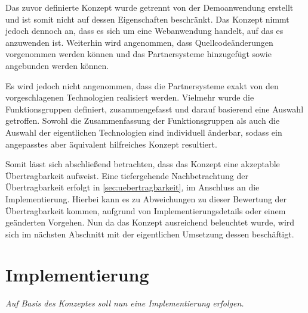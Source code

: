	Das zuvor definierte Konzept wurde getrennt von der Demoanwendung erstellt und ist somit nicht auf dessen Eigenschaften beschränkt. Das Konzept nimmt jedoch dennoch an, dass es sich um eine Webanwendung handelt, auf das es anzuwenden ist. Weiterhin wird angenommen, dass Quellcodeänderungen vorgenommen werden können und das Partnersysteme hinzugefügt sowie angebunden werden können.
	
	Es wird jedoch nicht angenommen, dass die Partnersysteme exakt von den vorgeschlagenen Technologien realisiert werden. Vielmehr wurde die Funktionsgruppen definiert, zusammengefasst und darauf basierend eine Auswahl getroffen. Sowohl die Zusammenfassung der Funktionsgruppen als auch die Auswahl der eigentlichen Technologien sind individuell änderbar, sodass ein angepasstes aber äquivalent hilfreiches Konzept resultiert.
	
	Somit lässt sich abschließend betrachten, dass das Konzept eine akzeptable Übertragbarkeit aufweist. Eine tiefergehende Nachbetrachtung der Übertragbarkeit erfolgt in \autoref{sec:uebertragbarkeit}, im Anschluss an die Implementierung. Hierbei kann es zu Abweichungen zu dieser Bewertung der Übertragbarkeit kommen, aufgrund von Implementierungsdetails oder einem geänderten Vorgehen. Nun da das Konzept ausreichend beleuchtet wurde, wird sich im nächsten Abschnitt mit der eigentlichen Umsetzung dessen beschäftigt.

\section{Implementierung}

	\textit{Auf Basis des Konzeptes soll nun eine Implementierung erfolgen.}